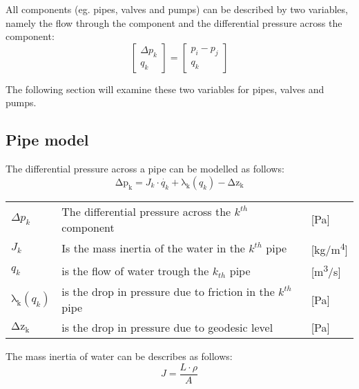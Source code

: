 All components (eg. pipes, valves and pumps) can be described by two variables, namely the flow through the component and the differential pressure across the component:
\begin{equation}
\begin{bmatrix} \Delta{p_{k}} \\ q_{k} \end{bmatrix} = 
\begin{bmatrix} p_{i} - p_{j} \\ q_{k} \end{bmatrix}    
\end{equation}

The following section will examine these two variables for pipes, valves and pumps.

\subsection{Pipe model}\label{subsec:PipeModel}
The differential pressure across a pipe can be modelled as follows:
\begin{equation}
    \mathrm{\Delta{p_{k}}} = J_{k}\cdot\dot{q_{k}}+\mathrm{\lambda_{k}}(q_{k})-\mathrm{\Delta{z_{k}}}
    \label{eq:Delta_p_pipe}
\end{equation}


	\begin{center}
		\begin{tabular}{l p{10cm} l}
			
			$\Delta{p_{k}}$ & The differential pressure across the $k^{th}$ component & [\si{Pa}]\\ 
		  	${J_{k}}$ & Is the mass inertia of the water in the $k^{th}$ pipe & [\si{kg}/\si{m^{4}}] \\
		  	$q_{k}$ & is the flow of water trough the $k_{th}$ pipe & [{\si{\meter\cubed}/\si{s}}] \\
		  	$\mathrm{\lambda_{k}}(q_{k})$ & is the drop in pressure due to friction in the $k^{th}$ pipe & [\si{Pa}] \\
		  	$\mathrm{\Delta{z_{k}}}$ & is the drop in pressure due to geodesic level & [\si{Pa}]\\
			\end{tabular}
	\end{center}

The mass inertia of water can be describes as follows:
\begin{equation}
	J= \frac{L\cdot \rho}{A}
\end{equation}

